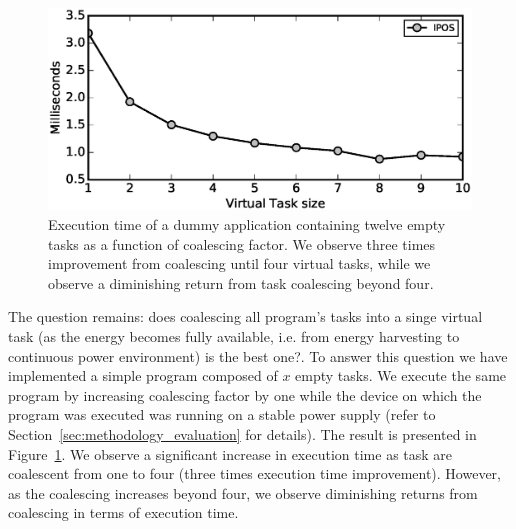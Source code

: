 \begin{figure}
	\centering
	\includegraphics[width=\columnwidth]{figures/virtualTaskSize.eps}
	\caption{Execution time of a dummy application containing twelve empty tasks as a function of coalescing factor. We observe three times improvement from coalescing until four virtual tasks, while we observe a diminishing return from task coalescing beyond four. }
	\label{fig:virtualTaskSize}
\end{figure}

The question remains: does coalescing all program's tasks into a singe virtual task (as the energy becomes fully available, i.e. from energy harvesting to continuous power environment) is the best one?. To answer this question we have implemented a simple program composed of $x$ empty tasks. We execute the same program by increasing coalescing factor by one while the device on which the program was executed was running on a stable power supply (refer to Section~\ref{sec:methodology_evaluation} for details). The result is presented in Figure~\ref{fig:virtualTaskSize}. We observe a significant increase in execution time as task are coalescent from one to four (three times execution time improvement). However, as the coalescing increases beyond four, we observe diminishing returns from coalescing in terms of execution time. 

%		
%		
